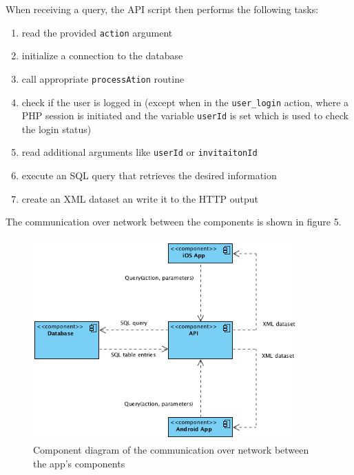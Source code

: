 \documentclass[12pt]{scrartcl}
\begin{document}
\newpage
When receiving a query, the API script then performs the following tasks:

\begin{enumerate}
	\item read the provided \texttt{action} argument
	\item initialize a connection to the database
	\item call appropriate \texttt{processAtion} routine
	\item check if the user is logged in (except when in the \texttt{user\_login} action, where a PHP session is initiated and the variable \texttt{userId} is set which is used to check the login status)
	\item read additional arguments like \texttt{userId} or \texttt{invitaitonId}
	\item execute an SQL query that retrieves the desired information
	\item create an XML dataset an write it to the HTTP output
	
\end{enumerate}

The communication over network between the components is shown in figure 5.\\

\begin{figure}[h]
	\begin{center}
		\includegraphics[width=0.9\textwidth]{../../spec/components/network_components.png}
		\caption[Component diagram of the communication over network between the app's components]{Component diagram of the communication over network between the app's components}
		\label{fig:network-component-diagram}
	\end{center}
\end{figure}
\end{document}
